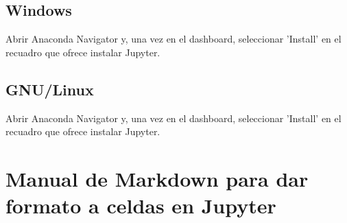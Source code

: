 \documentclass{article}
\begin{document}
        \subsection{Windows}
            Abrir Anaconda Navigator y, una vez en el dashboard, seleccionar 'Install' en el recuadro que
            ofrece instalar Jupyter.
        \subsection{GNU/Linux}
            Abrir Anaconda Navigator y, una vez en el dashboard, seleccionar 'Install' en el recuadro que
            ofrece instalar Jupyter.
    
    \newpage
    \section{Manual de Markdown para dar formato a celdas en Jupyter}
\end{document}
